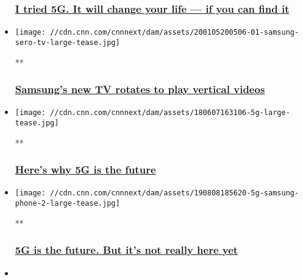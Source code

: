 \begin{itemize}
{  \subsubsection{\texorpdfstring{\href{/2019/08/09/tech/5g-review/index.html}{I
  tried 5G. It will change your life --- if you can find
  it}}{I tried 5G. It will change your life --- if you can find it}}\label{i-tried-5g-it-will-change-your-life--if-you-can-find-it}}
\item
  \href{/videos/business/2020/01/06/samsung-sero-vertical-tv-ces-zw-gr-orig.cnn-business}{}

  \texttt{[image: //cdn.cnn.com/cnnnext/dam/assets/200105200506-01-samsung-sero-tv-large-tease.jpg]}

  **

  \hypertarget{samsungs-new-tv-rotates-to-play-vertical-videos}{%
  \subsubsection{\texorpdfstring{\href{/videos/business/2020/01/06/samsung-sero-vertical-tv-ces-zw-gr-orig.cnn-business}{Samsung's
  new TV rotates to play vertical
  videos}}{Samsung's new TV rotates to play vertical videos}}\label{samsungs-new-tv-rotates-to-play-vertical-videos}}
\item
  \href{/videos/business/2018/10/03/5g-explained-orig.cnn-business}{}

  \texttt{[image: //cdn.cnn.com/cnnnext/dam/assets/180607163106-5g-large-tease.jpg]}

  **

  \hypertarget{heres-why-5g-is-the-future}{%
  \subsubsection{\texorpdfstring{\href{/videos/business/2018/10/03/5g-explained-orig.cnn-business}{Here's
  why 5G is the
  future}}{Here's why 5G is the future}}\label{heres-why-5g-is-the-future}}
\item
  \href{/videos/business/2019/08/08/5g-samsung-tmobile-cell-phone-review-orig.cnn-business}{}

  \texttt{[image: //cdn.cnn.com/cnnnext/dam/assets/190808185620-5g-samsung-phone-2-large-tease.jpg]}

  **

  \hypertarget{5g-is-the-future-but-its-not-really-here-yet}{%
  \subsubsection{\texorpdfstring{\href{/videos/business/2019/08/08/5g-samsung-tmobile-cell-phone-review-orig.cnn-business}{5G
  is the future. But it's not really here
  yet}}{5G is the future. But it's not really here yet}}\label{5g-is-the-future-but-its-not-really-here-yet}}
\item
  \href{/2019/12/10/perspectives/5g-technology-t-mobile-att-verizon/index.html}{}


\end{itemize}
